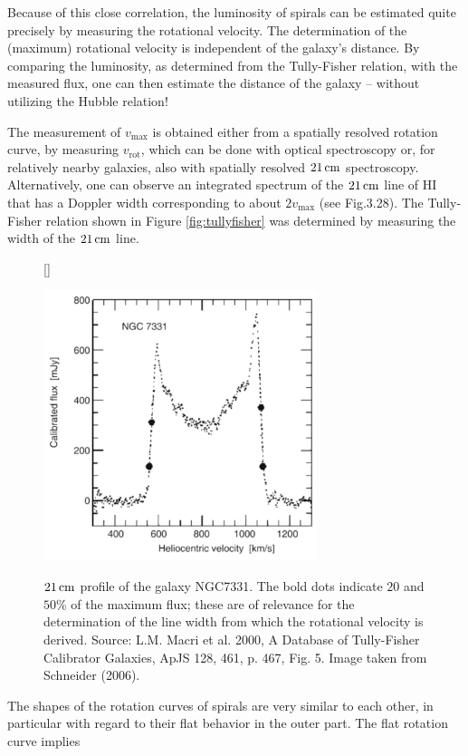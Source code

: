 \documentclass[a4paper,11pt]{article}
\begin{document}
{\noindent}Because of this close correlation, the luminosity of spirals can be estimated quite precisely by measuring the rotational velocity. The determination of the (maximum) rotational velocity is independent of the galaxy’s distance. By comparing the luminosity, as determined from the Tully-Fisher relation, with the measured flux, one can then estimate the distance of the galaxy -- without utilizing the Hubble relation!

{\noindent}The measurement of $v_\mathrm{max}$ is obtained either from a spatially resolved rotation curve, by measuring $v_\mathrm{rot}$, which can be done with optical spectroscopy or, for relatively nearby galaxies, also with spatially resolved $21\,{\rm cm}$ spectroscopy. Alternatively, one can observe an integrated spectrum of the $21\,{\rm cm}$ line of HI that has a Doppler width corresponding to about $2v_\mathrm{max}$ (see Fig.3.28). The Tully-Fisher relation shown in Figure \ref{fig:tullyfisher} was determined by measuring the width of the $21\,{\rm cm}$ line.

\begin{figure}[h]
    [\FBwidth]
    {\caption{\footnotesize{$21\,{\rm cm}$ profile of the galaxy NGC7331. The bold dots indicate $20$ and $50$\% of the maximum flux; these are of relevance for the determination of the line width from which the rotational velocity is derived. Source: L.M. Macri et al. 2000, A Database of Tully-Fisher Calibrator Galaxies, ApJS 128, 461, p. 467, Fig. 5. Image taken from Schneider (2006).}}
    \label{fig:21cmvrot}}
    {\includegraphics[width=8cm]{figures/21cm_vrot.png}}
\end{figure}

{\noindent}The shapes of the rotation curves of spirals are very similar to each other, in particular with regard to their flat behavior in the outer part. The flat rotation curve implies
\end{document}

